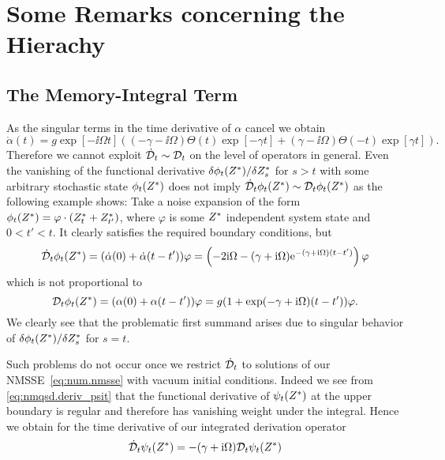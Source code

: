 \chapter{Some Remarks concerning the Hierachy}
\label{cha:hierarchy}

\section{The Memory-Integral Term}
\label{sec:hierarchy.memory_integral}

As the singular terms in the time derivative of $\alpha$ cancel we obtain
\begin{equation*}
  \dot\alpha(t) = g \exp[-\ii \Omega t] \left( (-\gamma - \ii\Omega) \Theta(t) \exp[-\gamma t] + (\gamma - \ii\Omega)\Theta(-t)\exp[\gamma t] \right).
\end{equation*}
Therefore we cannot exploit $\dot{\mathcal{D}}_t \sim \mathcal{D}_t$ on the level of operators in general.
Even the vanishing of the functional derivative $\delta \phi_t({Z}^*) / \delta {Z}^*_s$ for $s > t$ with some arbitrary stochastic state $\phi_t({Z}^*)$ does not imply $\dot{\mathcal{D}}_t \phi_t({Z}^*) \sim \mathcal{D}_t\phi_t({Z}^*)$ as the following example shows:
Take a noise expansion of the form $\phi_t({Z}^*) = \varphi \cdot ({Z}^*_t + {Z}^*_{t'})$, where $\varphi$ is some ${Z}^*$ independent system state and $0 < t' < t$.
It clearly satisfies the required boundary conditions, but
\begin{equation*}
  \dot\adjZZ_t \phi_t(\ZZ) = (\dot\alpha(0) + \dot\alpha(t-t')) \varphi = \left( -2\ii\Omega - (\gamma + \ii\Omega) \exp[-(\gamma + \ii\Omega) (t-t')] \right) \varphi
\end{equation*}
which is not proportional to
\begin{equation*}
  \adjZZ_t \phi_t(\ZZ) = (\alpha(0) + \alpha(t - t')) \varphi = g (1 + \exp(-\gamma + \ii \Omega)(t-t')) \varphi.
\end{equation*}
We clearly see that the problematic first summand arises due to singular behavior of $\delta \phi_t({Z}^*) / \delta {Z}^*_s$ for $s = t$.

Such problems do not occur once we restrict $\dot{\mathcal{D}}_t$ to solutions of our NMSSE~\ref{eq:num.nmsse} with vacuum initial conditions.
Indeed we see from \autoref{eq:nmqsd.deriv_psit} that the functional derivative of $\psitZ$ at the upper boundary is regular and therefore has vanishing weight under the integral.
Hence we obtain for the time derivative of our integrated derivation operator
\begin{equation}
  \dot\adjZZ_t \psitZ = - (\gamma + \ii \Omega) \adjZZ_t\psitZ
  \label{eq:num.dot_adjZZt}
\end{equation}

